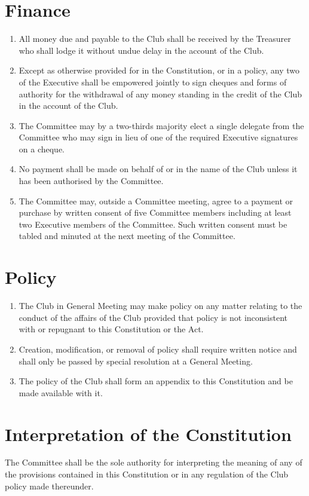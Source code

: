 \documentclass[11pt]{article} %
\begin{document}
\section{Finance}
\begin{enumerate}
	\item All money due and payable to the Club shall be received by the Treasurer who shall lodge it without undue delay in the account of the Club.
	\item Except as otherwise provided for in the Constitution, or in a policy, any two of the Executive shall be empowered jointly to sign cheques and forms of authority for the withdrawal of any money standing in the credit of the Club in the account of the Club.
	\item The Committee may by a two-thirds majority elect a single delegate from the Committee who may sign in lieu of one of the required Executive signatures on a cheque.
	\item No payment shall be made on behalf of or in the name of the Club unless it has been authorised by the Committee.
	\item The Committee may, outside a Committee meeting, agree to a payment or purchase by written consent of five Committee members including at least two Executive members of the Committee. Such written consent must be tabled and minuted at the next meeting of the Committee.
\end{enumerate}

\section{Policy}
\begin{enumerate}
	\item The Club in General Meeting may make policy on any matter relating to the conduct of the affairs of the Club provided that policy is not inconsistent with or repugnant to this Constitution or the Act.
	\item Creation, modification, or removal of policy shall require written notice and shall only be passed by special resolution at a General Meeting.
	\item The policy of the Club shall form an appendix to this Constitution and be made available with it.
\end{enumerate}

\section{Interpretation of the Constitution}
The Committee shall be the sole authority for interpreting the meaning of any of the provisions contained in this Constitution or in any regulation of the Club policy made thereunder.
\end{document}
